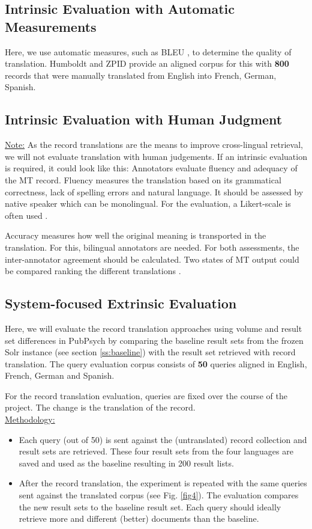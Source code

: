 \documentclass[a4paper,11pt]{article}
\begin{document}
\subsection{Intrinsic Evaluation with Automatic Measurements}
Here, we use automatic measures, such as BLEU \cite{papineni_bleu:_2002}, to determine the quality of translation. Humboldt and ZPID provide an aligned corpus for this with \textbf{800} records that were manually translated from English into French, German, Spanish. 

\subsection{Intrinsic Evaluation with Human Judgment}
\underline{Note:} As the record translations are the means to improve cross-lingual retrieval, we will not evaluate translation with human judgements. If an intrinsic evaluation is required, it could look like this:
Annotators evaluate fluency and adequacy of the MT record. Fluency measures the translation based on its grammatical correctness, lack of spelling errors and natural language. It should be assessed by native speaker which can be monolingual. For the evaluation, a Likert-scale is often used \cite[Ch. 4]{chen_multilingual_2016}.

Accuracy measures how well the original meaning is transported in the translation. For this, bilingual annotators are needed. For both assessments, the inter-annotator agreement should be calculated.
Two states of MT output could be compared ranking the different translations \cite{Vilar:2007}.

\subsection{System-focused Extrinsic Evaluation}
Here, we will evaluate the record translation approaches using volume and result set differences in PubPsych by comparing the baseline result sets from the frozen Solr instance (see section \ref{ss:baseline}) with the result set retrieved with record translation. 
The query evaluation corpus consists of \textbf{50} queries aligned in English, French, German and Spanish. 

For the record translation evaluation, queries are fixed over the course of the project. The change is the translation of the record.\\

\underline{Methodology:}
\begin{itemize}
\item Each query (out of 50) is sent against the (untranslated) record collection and result sets are retrieved. These four result sets from the four languages are saved and used as the baseline resulting in 200 result lists.

\item After the record translation, the experiment is repeated with the same queries sent against the translated corpus (see Fig. \ref{fig4}). The evaluation compares the new result sets to the baseline result set. Each query should ideally retrieve more and different (better) documents than the baseline. 
\end{itemize}
\end{document}
